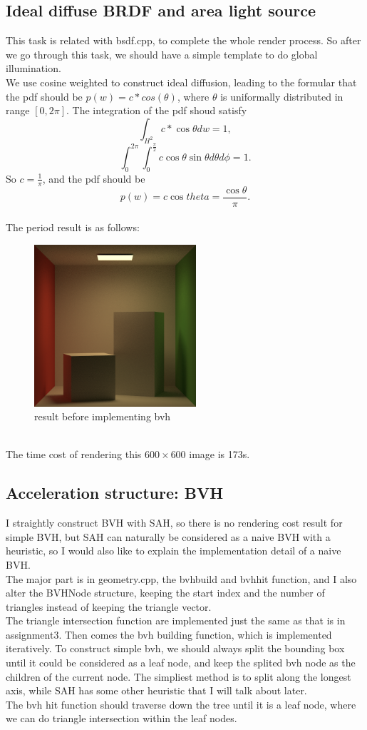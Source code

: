 \documentclass[acmtog]{acmart}
\begin{document}
\subsection{Ideal diffuse BRDF and area light source}
This task is related with bsdf.cpp, to complete the whole render process. So after we go through this task, we should have a simple template to do global illumination.\\
We use cosine weighted to construct ideal diffusion, leading to the formular that the pdf should be $p(w)=c*cos(\theta)$, where $\theta$ is uniformally distributed in range $[0,2\pi]$. The integration of the pdf shoud satisfy $$\int_{H^2}c*\cos{\theta}dw=1,$$
$$\int_{0}^{2\pi}\int_{0}^{\frac{\pi}{2}}c\cos{\theta}\sin{\theta}d\theta d\phi=1.$$
So $c=\frac{1}{\pi}$, and the pdf should be $$p(w)=c\cos{theta}=\frac{\cos{\theta}}{\pi}.$$\\
The period result is as follows:
\begin{figure}[h]
	\includegraphics[width=6.0cm,height=6.0cm]{without_bvh.png}
	\caption{result before implementing bvh}
\end{figure}\\
The time cost of rendering this $600\times 600$ image is 173s.

\subsection{Acceleration structure: BVH}
I straightly construct BVH with SAH, so there is no rendering cost result for simple BVH, but SAH can naturally be considered as a naive BVH with a heuristic, so I would also like to explain the implementation detail of a naive BVH.\\
The major part is in geometry.cpp, the bvhbuild and bvhhit function, and I also alter the BVHNode structure, keeping the start index and the number of triangles instead of keeping the triangle vector.\\
The triangle intersection function are implemented just the same as that is in assignment3. Then comes the bvh building function, which is implemented iteratively. To construct simple bvh, we should always split the bounding box until it could be considered as a leaf node, and keep the splited bvh node as the children of the current node.
The simpliest method is to split along the longest axis, while SAH has some other heuristic that I will talk about later.\\
The bvh hit function should traverse down the tree until it is a leaf node, where we can do triangle intersection within the leaf nodes.
\end{document}
